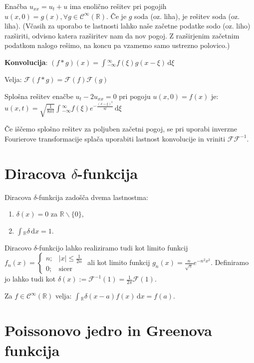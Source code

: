 \documentclass[10pt,a4paper]{amsart}
\theoremstyle{definition} %
\theoremstyle{plain} %
\newcommand{\dx}{\ensuremath{\,\mathrm{d}x}}
\newcommand{\dxi}{\ensuremath{\,\mathrm{d}\xi}}
\let\oldint\int
\renewcommand{\int}{\oldint \!}
\newcommand{\R}{\mathbb R}
\newcommand{\F}{\mathcal{F}}
\newcommand{\Cont}{\mathcal{C}}
\begin{document}
Enačba $u_{xx} = u_t + u$ ima enolično rešitev pri pogojih $u(x,0)=g(x), \forall
g \in \Cont^\infty (\R)$. Če je $g$ soda (oz. liha), je rešitev soda (oz. liha).
(Včasih za uporabo te lastnosti lahko naše začetne podatke sodo (oz. liho)
razširiti, odvisno katera razširitev nam da nov pogoj. Z razširjenim začetnim
podatkom nalogo rešimo, na koncu pa vzamemo samo ustrezno polovico.)

\textbf{Konvolucija}: $(f \ast g) (x) = \int_{-\infty}^\infty f(\xi) g(x-\xi)
\dxi$

Velja: $\F (f \ast g) = \F(f) \F (g)$

Splošna rešitev enačbe $u_t - 2u_{xx} = 0$ pri pogoju $u(x,0) = f(x)$ je:
$u(x,t) = \sqrt{ \frac{1}{8 \pi t}} \int_{-\infty}^\infty f(\xi) e^{- \frac{(x-
\xi )^2}{8t}} \dxi$

Če iščemo splošno rešitev za poljuben začetni pogoj, se pri uporabi inverzne
Fourierove transformacije splača uporabiti lastnost konvolucije in vriniti $\F
\F^{-1}$.


\vspace{-0.4cm}
\section*{Diracova $\delta$-funkcija}

Diracova $\delta$-funkcija zadošča dvema lastnostma: \begin{enumerate}

\item $\delta (x) = 0$ za $\R \backslash \{0\}$,

\item $\int_\R \delta \dx = 1$.

\end{enumerate}

Diracovo $\delta$-funkcijo lahko realiziramo tudi kot limito funkcij $f_n (x) =
\begin{cases} n;& |x| \leq \frac{1}{2n} \\ 0;& \text{sicer}\end{cases}$ ali kot
limito funkcij $g_n(x) = \frac{n}{\sqrt{\pi}} e^{-n^2x^2}$. Definiramo jo lahko
tudi kot $\delta (x) := \F^{-1}(1) = \frac{1}{2\pi} \F (1)$.

Za $f \in \Cont^\infty (\R)$ velja: $\int_\R \delta (x-a) f(x) \dx = f(a)$.

\section*{Poissonovo jedro in Greenova funkcija}
\end{document}
